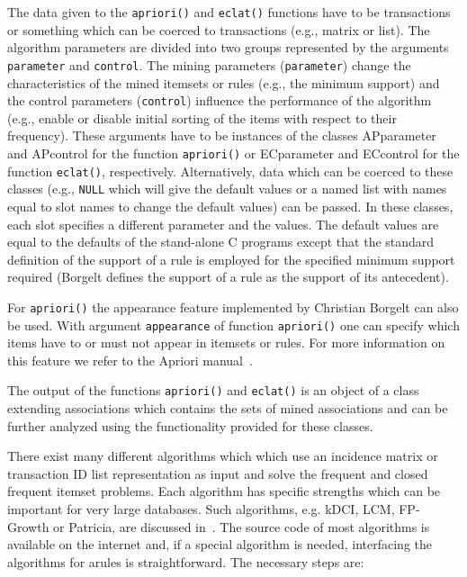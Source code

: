 \documentclass[10pt,a4paper]{article}
\newcommand{\strong}[1]{{\normalfont\fontseries{b}\selectfont #1}}
\newcommand{\class}[1]{\mbox{\textsf{#1}}}
\newcommand{\func}[1]{\mbox{\texttt{#1()}}}
\newcommand{\code}[1]{\mbox{\texttt{#1}}}
\newcommand{\pkg}[1]{\strong{#1}}
\newcommand{\proglang}[1]{\textsf{#1}}
\begin{document}
The data given to the \func{apriori} and \func{eclat} functions have to
be \class{transactions} or something which can be coerced to
\class{transactions} (e.g., \class{matrix} or \class{list}).  The
algorithm parameters are divided into two groups represented by the
arguments \code{parameter} and \code{control}.  The mining parameters
(\code{parameter}) change the characteristics of the mined itemsets or
rules (e.g., the minimum support) and the control parameters
(\code{control}) influence the performance of the algorithm (e.g.,
enable or disable initial sorting of the items with respect to their
frequency).  These arguments have to be instances of the classes
\class{APparameter} and \class{APcontrol} for the function
\func{apriori} or \class{ECparameter} and \class{ECcontrol} for the
function \func{eclat}, respectively.  Alternatively, data which can be
coerced to these classes (e.g., \code{NULL} which will give the default
values or a named list with names equal to slot names to change the
default values) can be passed.  In these classes, each slot specifies a
different parameter and the values.  The default values are equal to the
defaults of the stand-alone \proglang{C} programs
\citep{arules:Borgelt:2004} except that the standard definition of the
support of a rule \citep{arules:Agrawal+Imielinski+Swami:1993} is
employed for the specified minimum support required (Borgelt defines the
support of a rule as the support of its antecedent).

For \func{apriori} the appearance feature implemented by Christian
Borgelt can also be used.  With argument \code{appearance} of function
\func{apriori} one can specify which items have to or must not appear in
itemsets or rules.  For more information on this feature we refer to the
Apriori manual~\citep{arules:Borgelt:2004}.

The output of the functions \func{apriori} and \func{eclat} is an object
of a class extending \class{associations} which contains the sets of mined
associations and can be further analyzed using the functionality provided for
these classes.


There exist many different algorithms which 
which use an
incidence matrix or transaction ID list representation as input and
solve the frequent and
closed frequent itemset problems.  Each algorithm has specific strengths
which can be important for very large databases.  Such algorithms, e.g.
kDCI, LCM, FP-Growth or Patricia, are discussed
in~\cite{arules:Goethals+Zaki:2003}.  The source code of most algorithms
is available on the internet and, if a special algorithm is needed, 
interfacing the
algorithms for \pkg{arules} is straightforward.
The necessary steps are:
\end{document}

